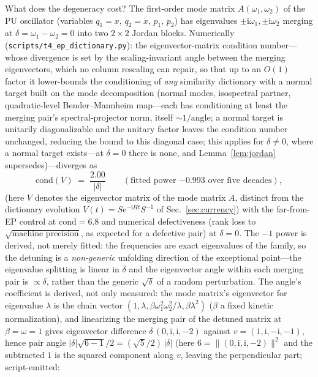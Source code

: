 \documentclass[11pt]{article}
\theoremstyle{definition}
\theoremstyle{remark}
\newcommand{\ii}{\mathrm{i}}
\newcommand{\ee}{\mathrm{e}}
\begin{document}
What does the degeneracy cost? The first-order mode matrix
$A(\omega_1,\omega_2)$ of the PU oscillator (variables
$q_1=x,\,q_2=\dot x,\,p_1,\,p_2$) has eigenvalues
$\pm\ii\omega_1,\pm\ii\omega_2$ merging at
$\delta=\omega_1-\omega_2=0$ into two $2\times2$ Jordan blocks.
Numerically (\texttt{scripts/t4\_ep\_dictionary.py}): the eigenvector-matrix
condition number---whose divergence is set by the scaling-invariant
angle between the merging eigenvectors, which no column rescaling can
repair, so that up to an $O(1)$ factor it lower-bounds the conditioning of
\emph{any} similarity dictionary with a normal target built on the mode
decomposition (normal modes, isospectral partner, quadratic-level
Bender--Mannheim map---each has conditioning at least the merging pair's
spectral-projector norm, itself $\sim1/\text{angle}$; a normal target
is unitarily diagonalizable and the unitary factor leaves the condition
number unchanged, reducing the bound to this diagonal case; this applies
for $\delta\neq0$, where a normal target exists---at $\delta=0$ there is
none, and Lemma~\ref{lem:jordan} supersedes)---diverges as
\begin{equation}
\mathrm{cond}(V)\;=\;\frac{2.00}{|\delta|}
\qquad(\text{fitted power }{-0.993}\text{ over five decades}),
\label{eq:condscaling}
\end{equation}
(here $V$ denotes the eigenvector matrix of the mode matrix $A$,
distinct from the dictionary evolution $V(t)=S\ee^{-\ii Ht}S^{-1}$ of
Sec.~\ref{sec:currency})
with the far-from-EP control at $\mathrm{cond}=6.8$ and
numerical defectiveness (rank loss to $\sqrt{\text{machine precision}}$,
as expected for a defective pair) at $\delta=0$. The $-1$ power is derived,
not merely fitted: the frequencies are exact eigenvalues of the
family, so the detuning is a \emph{non-generic} unfolding
direction of the exceptional point---the eigenvalue splitting is
linear in $\delta$ and the eigenvector angle within each merging
pair is $\propto\delta$, rather than the generic $\sqrt\delta$ of
a random perturbation. The angle's coefficient is derived, not
only measured: the mode matrix's eigenvector for eigenvalue
$\lambda$ is the chain vector
$(1,\lambda,\beta\omega_1^2\omega_2^2/\lambda,\beta\lambda^2)$
($\beta$ a fixed kinetic normalization),
and linearizing the merging pair of the detuned matrix at
$\beta=\omega=1$ gives eigenvector difference
$\delta\,(0,\ii,\ii,-2)$ against $v=(1,\ii,-\ii,-1)$, hence pair
angle $|\delta|\sqrt{6-1}/2=(\sqrt5/2)\,|\delta|$ (here $6=\|(0,\ii,\ii,-2)\|^2$ and the subtracted $1$ is the squared component along $v$, leaving the perpendicular part; script-emitted:
\end{document}

